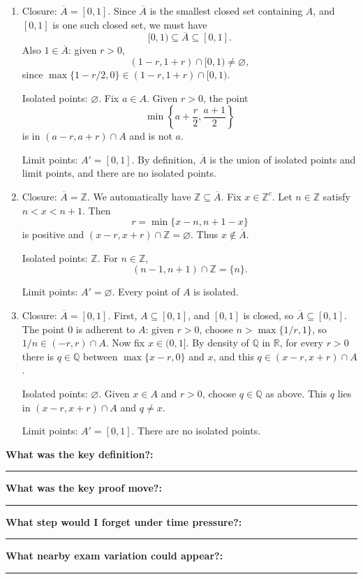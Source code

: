 \documentclass[12pt]{article}
\newcommand{\R}{\mathbb{R}}
\newcommand{\Q}{\mathbb{Q}}
\newcommand{\Z}{\mathbb{Z}}
\newcommand{\closure}[1]{\overline{#1}}
\newcommand{\writespace}[1]{\vspace*{#1}}
\newcommand{\fillfieldbig}[2]{%
  \par\noindent\textbf{#1:}\par
  \writespace{#2}
  \noindent\rule{\linewidth}{0.35pt}\par\vspace{0.15in}%
}
\newenvironment{solutionbox}[1]{%
  \begin{tcolorbox}[
    enhanced,
    breakable,
    colback=solgreen,
    colframe=green!45!black,
    fonttitle=\bfseries,
    title={#1}
  ]
}{%
  \end{tcolorbox}
}
\newcommand{\reflectionpage}[1]{%
  \begin{tcolorbox}[
    enhanced,
    colback=reflectcyan,
    colframe=cyan!55!black,
    fonttitle=\bfseries,
    title={Reflection \& Variation\hfill #1},
    height=8.45in
  ]
  \fillfieldbig{What was the key definition?}{1.15in}
  \fillfieldbig{What was the key proof move?}{1.15in}
  \fillfieldbig{What step would I forget under time pressure?}{1.15in}
  \fillfieldbig{What nearby exam variation could appear?}{1.35in}
  \end{tcolorbox}
}
\begin{document}
\newpage
\begin{solutionbox}{Official Solution (Professor)}
\begin{enumerate}[label=(\alph*)]
  \item Closure: \(\closure{A}=[0,1]\). Since \(\closure{A}\) is the smallest closed set containing \(A\), and \([0,1]\) is one such closed set, we must have
  \[
    [0,1)\subseteq\closure{A}\subseteq[0,1].
  \]
  Also \(1\in\closure{A}\): given \(r>0\),
  \[
    (1-r,1+r)\cap[0,1)\neq\varnothing,
  \]
  since \(\max\{1-r/2,0\}\in(1-r,1+r)\cap[0,1)\).

  Isolated points: \(\varnothing\). Fix \(a\in A\). Given \(r>0\), the point
  \[
    \min\left\{a+\frac r2,\frac{a+1}{2}\right\}
  \]
  is in \((a-r,a+r)\cap A\) and is not \(a\).

  Limit points: \(A'=[0,1]\). By definition, \(\closure{A}\) is the union of isolated points and limit points, and there are no isolated points.

  \item Closure: \(\closure{A}=\Z\). We automatically have \(\Z\subseteq\closure{A}\). Fix \(x\in\Z^c\). Let \(n\in\Z\) satisfy \(n<x<n+1\). Then
  \[
    r=\min\{x-n,n+1-x\}
  \]
  is positive and \((x-r,x+r)\cap\Z=\varnothing\). Thus \(x\notin\closure{A}\).

  Isolated points: \(\Z\). For \(n\in\Z\),
  \[
    (n-1,n+1)\cap\Z=\{n\}.
  \]

  Limit points: \(A'=\varnothing\). Every point of \(A\) is isolated.

  \item Closure: \(\closure{A}=[0,1]\). First, \(A\subseteq[0,1]\), and \([0,1]\) is closed, so \(\closure{A}\subseteq[0,1]\). The point \(0\) is adherent to \(A\): given \(r>0\), choose \(n>\max\{1/r,1\}\), so \(1/n\in(-r,r)\cap A\). Now fix \(x\in(0,1]\). By density of \(\Q\) in \(\R\), for every \(r>0\) there is \(q\in\Q\) between \(\max\{x-r,0\}\) and \(x\), and this \(q\in(x-r,x+r)\cap A\).

  Isolated points: \(\varnothing\). Given \(x\in A\) and \(r>0\), choose \(q\in\Q\) as above. This \(q\) lies in \((x-r,x+r)\cap A\) and \(q\neq x\).

  Limit points: \(A'=[0,1]\). There are no isolated points.
\end{enumerate}
\end{solutionbox}

\newpage
\reflectionpage{Homework 9, Problem 1}

\newpage
\end{document}
